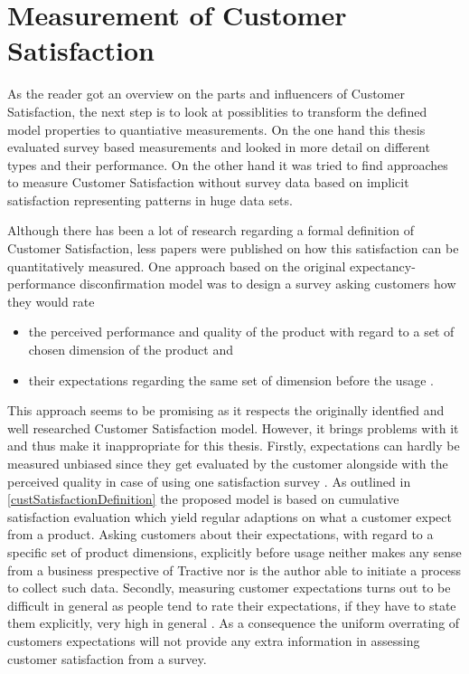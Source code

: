 \section{Measurement of Customer Satisfaction}
As the reader got an overview on the parts and influencers of Customer Satisfaction, the next step is to look at possiblities to transform the defined model properties to quantiative measurements. On the one hand this thesis evaluated survey based measurements and looked in more detail on different types and their performance. On the other hand it was tried to find approaches to measure Customer Satisfaction without survey data based on implicit satisfaction representing patterns in huge data sets. 

Although there has been a lot of research regarding a formal definition of Customer Satisfaction, less papers were published on how this satisfaction can be quantitatively measured. One approach based on the original expectancy-performance disconfirmation model was to design a survey asking customers how they would rate

\begin{itemize}
	\item the perceived performance and quality of the product with regard to a set of chosen dimension of the product and
	\item their expectations regarding the same set of dimension before the usage \cite{prakash1983reliability}.
\end{itemize}

This approach seems to be promising as it respects the originally identfied and well researched Customer Satisfaction model. However, it brings problems with it and thus make it inappropriate for this thesis. Firstly, expectations can hardly be measured unbiased since they get evaluated by the customer alongside with the perceived quality in case of using one satisfaction survey \cite{getty1995relationship}. As outlined in \ref{custSatisfactionDefinition} the proposed model is based on cumulative satisfaction evaluation which yield regular adaptions on what a customer expect from a product. Asking customers about their expectations, with regard to a specific set of product dimensions, explicitly before usage neither makes any sense from a business prespective of Tractive nor is the author able to initiate a process to collect such data. Secondly, measuring customer expectations turns out to be difficult in general as people tend to rate their expectations, if they have to state them explicitly, very high in general \cite{babakus1992empirical}. As a consequence the uniform overrating of customers expectations will not provide any extra information in assessing customer satisfaction from a survey.


